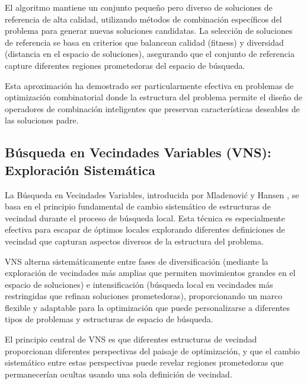 El algoritmo mantiene un conjunto pequeño pero diverso de soluciones de referencia de alta calidad, utilizando métodos de combinación específicos del problema para generar nuevas soluciones candidatas. La selección de soluciones de referencia se basa en criterios que balancean calidad (fitness) y diversidad (distancia en el espacio de soluciones), asegurando que el conjunto de referencia capture diferentes regiones prometedoras del espacio de búsqueda.

Esta aproximación ha demostrado ser particularmente efectiva en problemas de optimización combinatorial donde la estructura del problema permite el diseño de operadores de combinación inteligentes que preservan características deseables de las soluciones padre.

\subsection{Búsqueda en Vecindades Variables (VNS): Exploración Sistemática}

La Búsqueda en Vecindades Variables, introducida por Mladenović y Hansen \cite{mladenovic1997variable}, se basa en el principio fundamental de cambio sistemático de estructuras de vecindad durante el proceso de búsqueda local. Esta técnica es especialmente efectiva para escapar de óptimos locales explorando diferentes definiciones de vecindad que capturan aspectos diversos de la estructura del problema.

VNS alterna sistemáticamente entre fases de diversificación (mediante la exploración de vecindades más amplias que permiten movimientos grandes en el espacio de soluciones) e intensificación (búsqueda local en vecindades más restringidas que refinan soluciones prometedoras), proporcionando un marco flexible y adaptable para la optimización que puede personalizarse a diferentes tipos de problemas y estructuras de espacio de búsqueda.

El principio central de VNS es que diferentes estructuras de vecindad proporcionan diferentes perspectivas del paisaje de optimización, y que el cambio sistemático entre estas perspectivas puede revelar regiones prometedoras que permanecerían ocultas usando una sola definición de vecindad.

